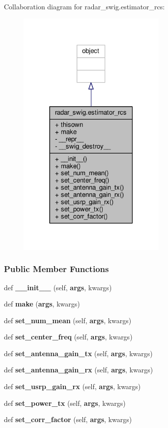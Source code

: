 Collaboration diagram for radar\+\_\+swig.\+estimator\+\_\+rcs\+:
\nopagebreak
\begin{figure}[H]
\begin{center}
\leavevmode
\includegraphics[width=206pt]{d1/d88/classradar__swig_1_1estimator__rcs__coll__graph}
\end{center}
\end{figure}
\subsubsection*{Public Member Functions}
\begin{DoxyCompactItemize}
\item 
def {\bf \+\_\+\+\_\+init\+\_\+\+\_\+} (self, {\bf args}, kwargs)
\item 
def {\bf make} ({\bf args}, kwargs)
\item 
def {\bf set\+\_\+num\+\_\+mean} (self, {\bf args}, kwargs)
\item 
def {\bf set\+\_\+center\+\_\+freq} (self, {\bf args}, kwargs)
\item 
def {\bf set\+\_\+antenna\+\_\+gain\+\_\+tx} (self, {\bf args}, kwargs)
\item 
def {\bf set\+\_\+antenna\+\_\+gain\+\_\+rx} (self, {\bf args}, kwargs)
\item 
def {\bf set\+\_\+usrp\+\_\+gain\+\_\+rx} (self, {\bf args}, kwargs)
\item 
def {\bf set\+\_\+power\+\_\+tx} (self, {\bf args}, kwargs)
\item 
def {\bf set\+\_\+corr\+\_\+factor} (self, {\bf args}, kwargs)
\end{DoxyCompactItemize}
